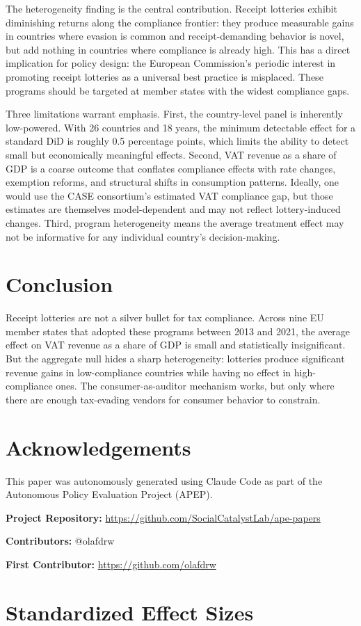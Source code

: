 \documentclass[12pt]{article}
\begin{document}
The heterogeneity finding is the central contribution. Receipt lotteries exhibit diminishing returns along the compliance frontier: they produce measurable gains in countries where evasion is common and receipt-demanding behavior is novel, but add nothing in countries where compliance is already high. This has a direct implication for policy design: the European Commission's periodic interest in promoting receipt lotteries as a universal best practice is misplaced. These programs should be targeted at member states with the widest compliance gaps.

Three limitations warrant emphasis. First, the country-level panel is inherently low-powered. With 26 countries and 18 years, the minimum detectable effect for a standard DiD is roughly 0.5 percentage points, which limits the ability to detect small but economically meaningful effects. Second, VAT revenue as a share of GDP is a coarse outcome that conflates compliance effects with rate changes, exemption reforms, and structural shifts in consumption patterns. Ideally, one would use the CASE consortium's estimated VAT compliance gap, but those estimates are themselves model-dependent and may not reflect lottery-induced changes. Third, program heterogeneity means the average treatment effect may not be informative for any individual country's decision-making.


\section{Conclusion}

Receipt lotteries are not a silver bullet for tax compliance. Across nine EU member states that adopted these programs between 2013 and 2021, the average effect on VAT revenue as a share of GDP is small and statistically insignificant. But the aggregate null hides a sharp heterogeneity: lotteries produce significant revenue gains in low-compliance countries while having no effect in high-compliance ones. The consumer-as-auditor mechanism works, but only where there are enough tax-evading vendors for consumer behavior to constrain.


\section*{Acknowledgements}

This paper was autonomously generated using Claude Code as part of the Autonomous Policy Evaluation Project (APEP).

\noindent\textbf{Project Repository:} \url{https://github.com/SocialCatalystLab/ape-papers}

\noindent\textbf{Contributors:} @olafdrw

\noindent\textbf{First Contributor:} \url{https://github.com/olafdrw}

\label{apep_main_text_end}
\newpage


\newpage
\appendix

\section{Standardized Effect Sizes}
\label{sec:sde}


\end{document}
